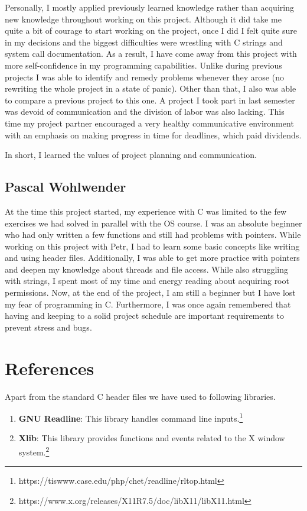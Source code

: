 \documentclass{article}
\begin{document}
Personally, I mostly applied previously learned knowledge rather than acquiring new knowledge throughout working on this project. Although it did take me quite a bit of courage to start working on the project, once I did I felt quite sure in my decisions and the biggest difficulties were wrestling with C strings and system call documentation. As a result, I have come away from this project with more self-confidence in my programming capabilities. Unlike during previous projects I was able to identify and remedy problems whenever they arose (no rewriting the whole project in a state of panic). Other than that, I also was able to compare a previous project to this one. A project I took part in last semester was devoid of communication and the division of labor was also lacking. This time my project partner encouraged a very healthy communicative environment with an emphasis on making progress in time for deadlines, which paid dividends.

In short, I learned the values of project planning and communication.


\subsection{Pascal Wohlwender}

At the time this project started, my experience with C was limited to the few exercises we had solved in parallel with the OS course. I was an absolute beginner who had only written a few functions and still had problems with pointers. While working on this project with Petr, I had to learn some basic concepts like writing and using header files. Additionally, I was able to get more practice with pointers and deepen my knowledge about threads and file access. While also struggling with strings, I spent most of my time and energy reading about acquiring root permissions. Now, at the end of the project, I am still a beginner but I have lost my fear of programming in C. Furthermore, I was once again remembered that having and keeping to a solid project schedule are important requirements to prevent stress and bugs. 

\section{References}

Apart from the standard C header files we have used to following libraries.

\begin{enumerate}
	\item \textbf{GNU Readline}: This library handles command line inputs.\footnote{https://tiswww.case.edu/php/chet/readline/rltop.html}
	\item \textbf{Xlib}: This library provides functions and events related to the X window system.\footnote{https://www.x.org/releases/X11R7.5/doc/libX11/libX11.html}
\end{enumerate}
\end{document}
